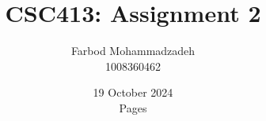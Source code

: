 \documentclass{article}
\title{CSC413: Assignment 2}
\author{Farbod Mohammadzadeh\\
    1008360462}
\date{19 October 2024\\ \pageref{LastPage} Pages}
\begin{document}
\Large
\maketitle
\newpage

\newpage
% 
% 
% 
% 
\end{document}
